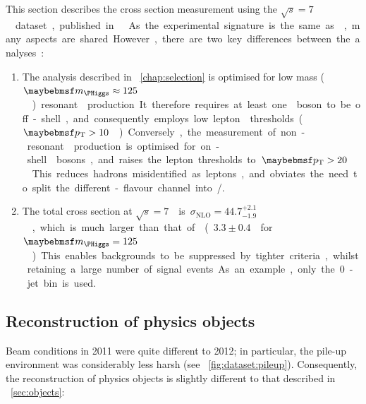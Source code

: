 
This section describes the \WW cross section measurement using the 
\unit{$\sqrt{s} = 7$}{\TeV} dataset, published in \Reference~\cite{WW-7TeV}.
As the experimental signature is the same as \HWW, many aspects are shared.
However, there are two key differences between the analyses: 

\begin{enumerate}
	\item The analysis described in \Chapter~\ref{chap:selection} is optimised for low 
	mass (\unit{$\mH \approx 125$}{\GeV}) resonant \WW production. It therefore requires 
	at least one \PW boson to be off-shell, and consequently employs low lepton \pt 
	thresholds (\unit{$\pt > 10$}{\GeV}). Conversely, the measurement of non-resonant \WW 
	production is optimised for on-shell \PW bosons, and raises the lepton thresholds 
	to \unit{$\pt > 20$}{\GeV}. This reduces hadrons misidentified as leptons, and obviates 
	the need to split the different-flavour channel into \emch/\mech.

	\item The total \WW cross section at \unit{$\sqrt{s} = 7$}{\TeV} is 
	\unit{$\sigma_{\text{NLO}} = 44.7^{+2.1}_{-1.9}$}{\pico\barn}, which is much larger than 
	that of \ggHWW (\unit{$3.3 \pm 0.4$}{\pico\barn} for \unit{$\mH = 125$}{\GeV}). This 
	enables backgrounds to be suppressed by tighter criteria, whilst retaining a large 
	number of signal events. As an example, only the 0-jet bin is used.
\end{enumerate}



\subsection{Reconstruction of physics objects}

Beam conditions in 2011 were quite different to 2012; in particular, the pile-up 
environment was considerably less harsh (see \Figure~\ref{fig:dataset:pileup}). Consequently, 
the reconstruction of physics objects is slightly different to that described in 
\Section~\ref{sec:objects}:

